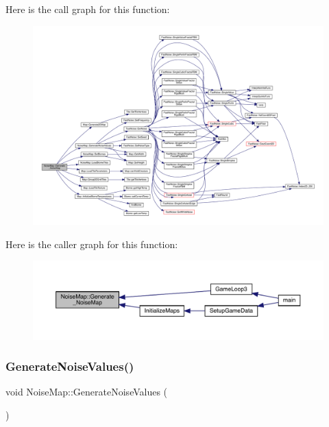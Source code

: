 Here is the call graph for this function\+:
\nopagebreak
\begin{figure}[H]
\begin{center}
\leavevmode
\includegraphics[width=350pt]{class_noise_map_a551072fd54a96722c96dea40dc24940e_cgraph}
\end{center}
\end{figure}
Here is the caller graph for this function\+:
\nopagebreak
\begin{figure}[H]
\begin{center}
\leavevmode
\includegraphics[width=350pt]{class_noise_map_a551072fd54a96722c96dea40dc24940e_icgraph}
\end{center}
\end{figure}
\mbox{\label{class_noise_map_aa9ba8032c97f9a5ea9f63c697b2f20e4}} 
\subsubsection{\texorpdfstring{Generate\+Noise\+Values()}{GenerateNoiseValues()}}
{\footnotesize\ttfamily void Noise\+Map\+::\+Generate\+Noise\+Values (\begin{DoxyParamCaption}{ }\end{DoxyParamCaption})}

